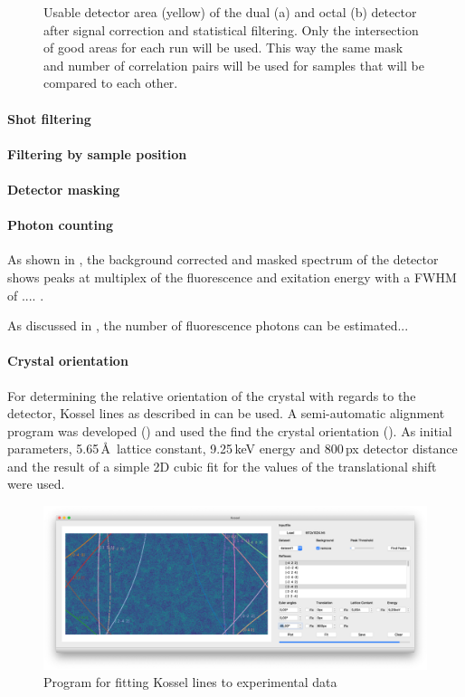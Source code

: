 \begin{figure}
\begin{subfigure}{0.45\textwidth}
	\end{subfigure}
	\caption{Usable detector area (yellow) of the dual (a) and octal (b) detector after signal correction and statistical filtering. Only the intersection of good areas for each run will be used. This way the same mask and number of correlation pairs will be used for samples that will be compared to each other.}	
\end{figure}

\paragraph{Shot filtering}

\paragraph{Filtering by sample position}
\paragraph{Detector masking}

\paragraph{Photon counting}



As shown in , the background corrected and masked spectrum of the detector shows peaks at multiplex of the fluorescence and exitation energy with a FWHM of .... . 


As discussed in , the number of fluorescence photons can be estimated...




\paragraph{Crystal orientation}
For determining the relative orientation of the crystal with regards to the detector, Kossel lines as described in  can be used.  A semi-automatic alignment program was developed () and used the find the crystal orientation (). As initial parameters, 5.65\,\AA\, lattice constant, 9.25\,keV energy and 800\,px detector distance and the result of a simple 2D cubic fit for the values of the translational shift were used. 
\begin{figure}
	\centering
	\includegraphics[width=0.8\linewidth]{images/kosselfit.png}
	\caption{Program for fitting Kossel lines to experimental data}
	\label{fig:kosselfig}
\end{figure}

